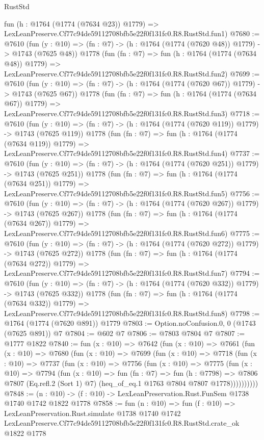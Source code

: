 \begin{lexlean}{RustStd}
\begin{coremodule}
    fun (h : @1764 (@1774 (@7634 @23)) @1779) =>
    LexLeanPreserve.Cf77c94de59112708bfb5e22f0f131fc0.R8.RustStd.fun1)
@7680 := @7610
    (fun (y : @10) => (fn : @7) -> (h : @1764 (@1774 (@7620 @48)) @1779) -> @1743 (@7625 @48))
    @1778
    (fun (fn : @7) =>
    fun (h : @1764 (@1774 (@7634 @48)) @1779) =>
    LexLeanPreserve.Cf77c94de59112708bfb5e22f0f131fc0.R8.RustStd.fun2)
@7699 := @7610
    (fun (y : @10) => (fn : @7) -> (h : @1764 (@1774 (@7620 @67)) @1779) -> @1743 (@7625 @67))
    @1778
    (fun (fn : @7) =>
    fun (h : @1764 (@1774 (@7634 @67)) @1779) =>
    LexLeanPreserve.Cf77c94de59112708bfb5e22f0f131fc0.R8.RustStd.fun3)
@7718 := @7610
    (fun (y : @10) => (fn : @7) -> (h : @1764 (@1774 (@7620 @119)) @1779) -> @1743 (@7625 @119))
    @1778
    (fun (fn : @7) =>
    fun (h : @1764 (@1774 (@7634 @119)) @1779) =>
    LexLeanPreserve.Cf77c94de59112708bfb5e22f0f131fc0.R8.RustStd.fun4)
@7737 := @7610
    (fun (y : @10) => (fn : @7) -> (h : @1764 (@1774 (@7620 @251)) @1779) -> @1743 (@7625 @251))
    @1778
    (fun (fn : @7) =>
    fun (h : @1764 (@1774 (@7634 @251)) @1779) =>
    LexLeanPreserve.Cf77c94de59112708bfb5e22f0f131fc0.R8.RustStd.fun5)
@7756 := @7610
    (fun (y : @10) => (fn : @7) -> (h : @1764 (@1774 (@7620 @267)) @1779) -> @1743 (@7625 @267))
    @1778
    (fun (fn : @7) =>
    fun (h : @1764 (@1774 (@7634 @267)) @1779) =>
    LexLeanPreserve.Cf77c94de59112708bfb5e22f0f131fc0.R8.RustStd.fun6)
@7775 := @7610
    (fun (y : @10) => (fn : @7) -> (h : @1764 (@1774 (@7620 @272)) @1779) -> @1743 (@7625 @272))
    @1778
    (fun (fn : @7) =>
    fun (h : @1764 (@1774 (@7634 @272)) @1779) =>
    LexLeanPreserve.Cf77c94de59112708bfb5e22f0f131fc0.R8.RustStd.fun7)
@7794 := @7610
    (fun (y : @10) => (fn : @7) -> (h : @1764 (@1774 (@7620 @332)) @1779) -> @1743 (@7625 @332))
    @1778
    (fun (fn : @7) =>
    fun (h : @1764 (@1774 (@7634 @332)) @1779) =>
    LexLeanPreserve.Cf77c94de59112708bfb5e22f0f131fc0.R8.RustStd.fun8)
@7798 := @1764 (@1774 (@7620 @891)) @1779
@7803 := Option.noConfusion.{0, 0} (@1743 (@7625 @891)) @7
@7804 := @602 @7
@7806 := @7803 @7804 @7
@7807 := @1777 @1822
@7840 := fun (x : @10) =>
  @7642
    (fun (x : @10) =>
    @7661
      (fun (x : @10) =>
      @7680
        (fun (x : @10) =>
        @7699
          (fun (x : @10) =>
          @7718
            (fun (x : @10) =>
            @7737
              (fun (x : @10) =>
              @7756
                (fun (x : @10) =>
                @7775
                  (fun (x : @10) =>
                  @7794
                    (fun (x : @10) =>
                    fun (fn : @7) =>
                    fun (h : @7798) =>
                    @7806
                      @7807
                      (Eq.refl.{2} (Sort 1) @7)
                      (heq_of_eq.{1} @1763 @7804 @7807 @1778))))))))))
@7848 := (n : @10) -> (f : @10) -> LexLeanPreservation.Rust.FunSem @1738 @1740 @1742 @1822 @1778
@7858 := fun (n : @10) =>
  fun (f : @10) =>
  LexLeanPreservation.Rust.simulate
    @1738
    @1740
    @1742
    LexLeanPreserve.Cf77c94de59112708bfb5e22f0f131fc0.R8.RustStd.crate_ok
    @1822
    @1778
\end{coremodule}
\end{lexlean}
